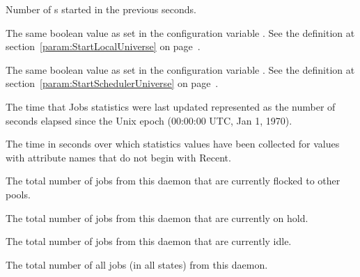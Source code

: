 \begin{description}
\item[\AdAttr{ShadowsStarted}:] Number of s started
  in the previous  seconds.

\item[\AdAttr{StartLocalUniverse}:] The same boolean value as set in the
  configuration variable .
  See the definition at section~\ref{param:StartLocalUniverse} on
  page~\pageref{param:StartLocalUniverse}.

\item[\AdAttr{StartSchedulerUniverse}:] The same boolean value as set in the
  configuration variable .
  See the definition at section~\ref{param:StartSchedulerUniverse} on
  page~\pageref{param:StartSchedulerUniverse}.

\item[\AdAttr{StatsLastUpdateTime}:] The time that Jobs statistics were last updated
  represented as the number of seconds elapsed since
    the Unix epoch (00:00:00 UTC, Jan 1, 1970).

\item[\AdAttr{StatsLifetime}:] The time in seconds over which statistics values have been collected
  for values with attribute names that do not begin with Recent.

\item[\AdAttr{TotalFlockedJobs}:] The total number of jobs from this
   daemon that are currently flocked to other pools.

\item[\AdAttr{TotalHeldJobs}:] The total number of jobs from this
   daemon that are currently on hold.

\item[\AdAttr{TotalIdleJobs}:] The total number of jobs from this
   daemon that are currently idle.

\item[\AdAttr{TotalJobAds}:] The total number of all jobs (in all 
  states) from this  daemon.


\end{description}
